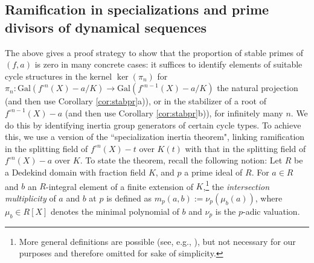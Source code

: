 \documentclass[a4paper]{amsart}
\begin{document}
  \subsection{Ramification in specializations and prime divisors of dynamical sequences}
  The above gives a proof strategy to show that the proportion of stable primes of $(f,a)$ is zero in many concrete cases: it suffices to identify elements of suitable cycle structures in the kernel $\ker(\pi_n)$ for $\pi_n: \textrm{Gal}(f^{\circ n}(X)-a/K)\to \textrm{Gal}(f^{\circ n-1}(X)-a/K)$ the natural projection (and then use Corollary \ref{cor:stabpr}a)), or in the stabilizer of a root of $f^{\circ n-1}(X)-a$ (and then use Corollary \ref{cor:stabpr}b)), for infinitely many $n$. We do this by identifying inertia group generators of certain cycle types. To achieve this, we use a version of the ``specialization inertia theorem", linking ramification in the splitting field of $f^{\circ n}(X)-t$ over $K(t)$ with that in the splitting field of $f^{\circ n}(X)-a$ over $K$.    
  To state the theorem, recall the following notion: Let $R$ be a Dedekind domain with fraction field $K$, and $p$ a prime ideal of $R$. For $a\in R$ and $b$ an $R$-integral element of a finite extension of $K$,\footnote{More general definitions are possible (see, e.g., \cite{Leg}), but not necessary for our purposes and therefore omitted for sake of simplicity.} the {\it intersection multiplicity} of $a$ and $b$ at $p$ is defined as $m_p(a,b):=\nu_p(\mu_b(a))$, where $\mu_b\in R[X]$ denotes the minimal polynomial of $b$ and $\nu_p$ is the $p$-adic valuation.
\end{document}
